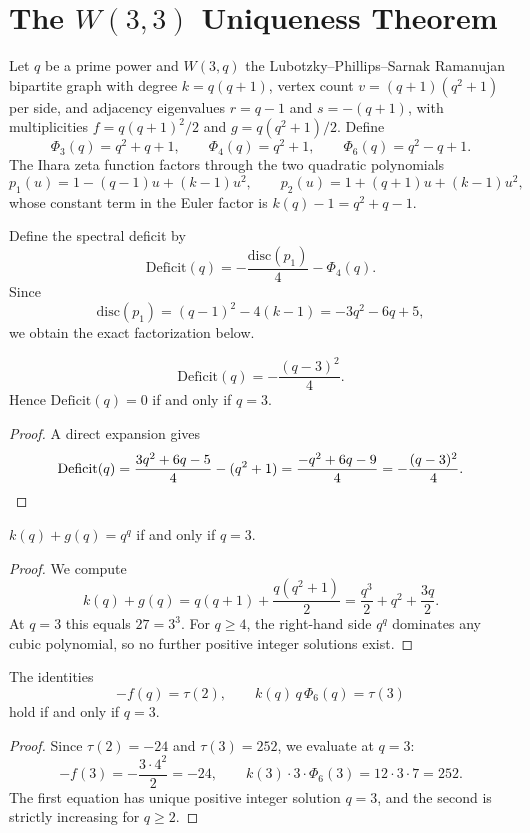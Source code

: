 \section{The $W(3,3)$ Uniqueness Theorem}
\label{sec:uniqueness}

Let $q$ be a prime power and $W(3,q)$ the Lubotzky--Phillips--Sarnak
Ramanujan bipartite graph with degree $k=q(q+1)$,
vertex count $v=(q+1)(q^2+1)$ per side, and adjacency eigenvalues
$r = q-1$ and $s = -(q+1)$, with multiplicities
$f = q(q+1)^2/2$ and $g = q(q^2+1)/2$.
Define
\[
  \Phi_3(q) = q^2+q+1,\qquad
  \Phi_4(q) = q^2+1,\qquad
  \Phi_6(q) = q^2-q+1.
\]
The Ihara zeta function factors through the two quadratic polynomials
\[
  p_1(u) = 1 - (q-1)u + (k-1)u^2,\qquad
  p_2(u) = 1 + (q+1)u + (k-1)u^2,
\]
whose constant term in the Euler factor is $k(q)-1 = q^2+q-1$.

\begin{definition}
Define the spectral deficit by
\[
  \mathrm{Deficit}(q) = -\frac{\mathrm{disc}(p_1)}{4} - \Phi_4(q).
\]
Since
\[
  \mathrm{disc}(p_1) = (q-1)^2 - 4(k-1) = -3q^2-6q+5,
\]
we obtain the exact factorization below.
\end{definition}

\begin{lemma}[C1]\label{lem:C1}
\[
  \mathrm{Deficit}(q) = -\frac{(q-3)^2}{4}.
\]
Hence $\mathrm{Deficit}(q)=0$ if and only if $q=3$.
\end{lemma}
\begin{proof}
A direct expansion gives
\[
  \mathrm{Deficit}(q)
  = \frac{3q^2+6q-5}{4} - (q^2+1)
  = \frac{-q^2+6q-9}{4}
  = -\frac{(q-3)^2}{4}. \qedhere
\]
\end{proof}

\begin{lemma}[C2]\label{lem:C2}
$k(q)+g(q)=q^q$ if and only if $q=3$.
\end{lemma}
\begin{proof}
We compute
\[
  k(q)+g(q)=q(q+1)+\frac{q(q^2+1)}{2} = \frac{q^3}{2}+q^2+\frac{3q}{2}.
\]
At $q=3$ this equals $27=3^3$.
For $q\ge 4$, the right-hand side $q^q$ dominates any cubic polynomial,
so no further positive integer solutions exist.
\end{proof}

\begin{lemma}[C3]\label{lem:C3}
The identities
\[
  -f(q)=\tau(2),\qquad k(q)\,q\,\Phi_6(q)=\tau(3)
\]
hold if and only if $q=3$.
\end{lemma}
\begin{proof}
Since $\tau(2)=-24$ and $\tau(3)=252$, we evaluate at $q=3$:
\[
  -f(3)=-\frac{3\cdot 4^2}{2}=-24,
  \qquad
  k(3)\cdot 3\cdot \Phi_6(3)=12\cdot 3\cdot 7=252.
\]
The first equation has unique positive integer solution $q=3$,
and the second is strictly increasing for $q\ge 2$.
\end{proof}

